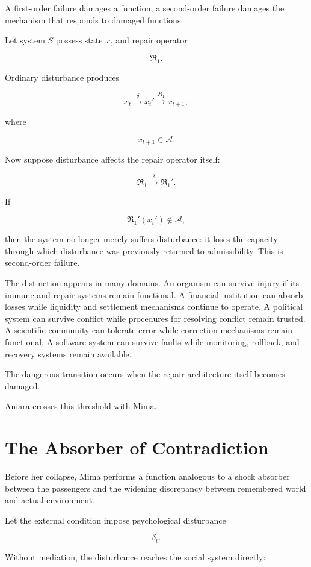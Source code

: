 \documentclass[11pt,oneside]{book}
\theoremstyle{definition}
\theoremstyle{remark}
\newcommand{\A}{\mathcal{A}}
\newcommand{\Repair}{\mathfrak{R}}
\begin{document}
A first-order failure damages a function; a second-order failure damages the mechanism that responds to damaged functions.

Let system \(S\) possess state \(x_t\) and repair operator

\[
\Repair_1.
\]

Ordinary disturbance produces

\[
x_t
\xrightarrow{\delta}
x_t'
\xrightarrow{\Repair_1}
x_{t+1},
\]

where

\[
x_{t+1}\in\A.
\]

Now suppose disturbance affects the repair operator itself:

\[
\Repair_1
\xrightarrow{\delta}
\Repair_1'.
\]

If

\[
\Repair_1'(x_t')
\notin\A,
\]

then the system no longer merely suffers disturbance: it loses the capacity through which disturbance was previously returned to admissibility. This is second-order failure.

The distinction appears in many domains. An organism can survive injury if its immune and repair systems remain functional. A financial institution can absorb losses while liquidity and settlement mechanisms continue to operate. A political system can survive conflict while procedures for resolving conflict remain trusted. A scientific community can tolerate error while correction mechanisms remain functional. A software system can survive faults while monitoring, rollback, and recovery systems remain available.

The dangerous transition occurs when the repair architecture itself becomes damaged.

Aniara crosses this threshold with Mima.

\section{The Absorber of Contradiction}

Before her collapse, Mima performs a function analogous to a shock absorber between the passengers and the widening discrepancy between remembered world and actual environment.

Let the external condition impose psychological disturbance

\[
\delta_t.
\]

Without mediation, the disturbance reaches the social system directly:
\end{document}
